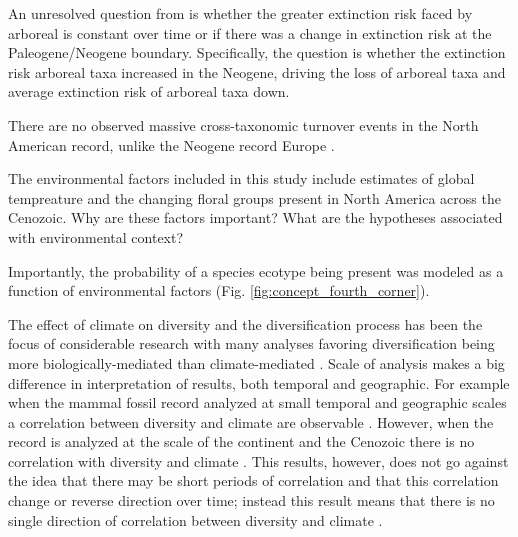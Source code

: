 \documentclass[12pt,letterpaper]{article}
\begin{document}
An unresolved question from \citet{Smits2015b} is whether the greater extinction risk faced by arboreal is constant over time or if there was a change in extinction risk at the Paleogene/Neogene boundary. Specifically, the question is whether the extinction risk arboreal taxa increased in the Neogene, driving the loss of arboreal taxa and average extinction risk of arboreal taxa down. 

There are no observed massive cross-taxonomic turnover events in the North American record, unlike the Neogene record Europe \citep{Alroy2009,Alroy1996a,Eronen2015,Janis1993a,Alroy2000g}.




The environmental factors included in this study include estimates of global tempreature and the changing floral groups present in North America across the Cenozoic. Why are these factors important? What are the hypotheses associated with environmental context?

Importantly, the probability of a species ecotype being present was modeled as a function of environmental factors (Fig. \ref{fig:concept_fourth_corner}). 

The effect of climate on diversity and the diversification process has been the focus of considerable research with many analyses favoring diversification being more biologically-mediated than climate-mediated \citep{Alroy1996a,Alroy2000g,Figueirido2012,Clyde1998a}. Scale of analysis makes a big difference in interpretation of results, both temporal and geographic. For example when the mammal fossil record analyzed at small temporal and geographic scales a correlation between diversity and climate are observable \citep{Clyde1998a}. However, when the record is analyzed at the scale of the continent and the Cenozoic there is no correlation with diversity and climate \citep{Alroy2000g}. This results, however, does not go against the idea that there may be short periods of correlation and that this correlation change or reverse direction over time; instead this result means that there is no single direction of correlation between diversity and climate \citep{Figueirido2012}. 
\end{document}
